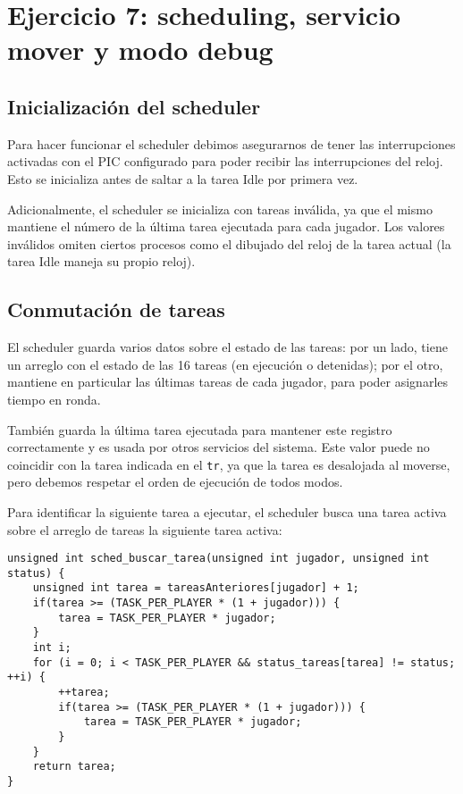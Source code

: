 \section{Ejercicio 7: scheduling, servicio mover y modo debug}
    
    \subsection{Inicialización del scheduler}

    Para hacer funcionar el scheduler debimos asegurarnos de tener las interrupciones activadas con el PIC configurado para poder recibir las interrupciones del reloj. Esto se inicializa antes de saltar a la tarea Idle por primera vez.

    Adicionalmente, el scheduler se inicializa con tareas inválida, ya que el mismo mantiene el número de la última tarea ejecutada para cada jugador. Los valores inválidos omiten ciertos procesos como el dibujado del reloj de la tarea actual (la tarea Idle maneja su propio reloj).

    \subsection{Conmutación de tareas}

    El scheduler guarda varios datos sobre el estado de las tareas: por un lado, tiene un arreglo con el estado de las 16 tareas (en ejecución o detenidas); por el otro, mantiene en particular las últimas tareas de cada jugador, para poder asignarles tiempo en ronda.

    También guarda la última tarea ejecutada para mantener este registro correctamente y es usada por otros servicios del sistema. Este valor puede no coincidir con la tarea indicada en el \texttt{tr}, ya que la tarea es desalojada al moverse, pero debemos respetar el orden de ejecución de todos modos.

    Para identificar la siguiente tarea a ejecutar, el scheduler busca una tarea activa sobre el arreglo de tareas la siguiente tarea activa:
    
    \lstset{escapechar=@,style=c}
    \begin{lstlisting}
unsigned int sched_buscar_tarea(unsigned int jugador, unsigned int status) {
    unsigned int tarea = tareasAnteriores[jugador] + 1;
    if(tarea >= (TASK_PER_PLAYER * (1 + jugador))) {
        tarea = TASK_PER_PLAYER * jugador;
    }
    int i;
    for (i = 0; i < TASK_PER_PLAYER && status_tareas[tarea] != status; ++i) {
        ++tarea;
        if(tarea >= (TASK_PER_PLAYER * (1 + jugador))) {
            tarea = TASK_PER_PLAYER * jugador;
        }
    }
    return tarea;
}
    \end{lstlisting}

